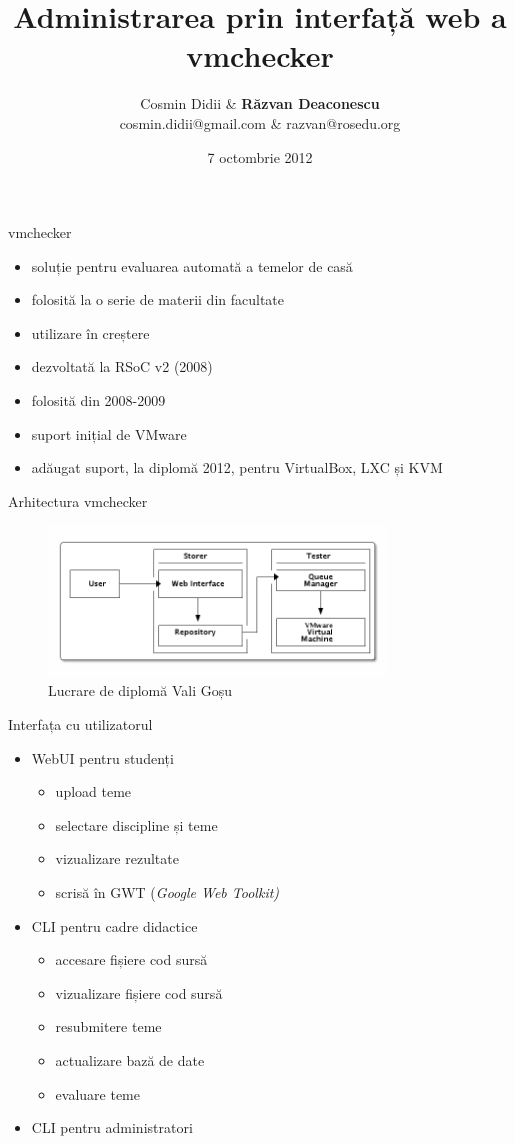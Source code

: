 \documentclass{simple}
\title[vmchecker]{Administrarea prin interfață web a vmchecker}
\institute{ROSEdu Summer of Code}
\author[Răzvan Deaconescu]{Cosmin Didii \& \textbf{Răzvan Deaconescu} \\
cosmin.didii@gmail.com \& razvan@rosedu.org}
\date{7 octombrie 2012}
\begin{document}
\frame{\titlepage}

\begin{frame}{vmchecker}
  \begin{itemize}
    \item soluție pentru evaluarea automată a temelor de casă
    \item folosită la o serie de materii din facultate
    \item utilizare în creștere
    \item dezvoltată la RSoC v2 (2008)
    \item folosită din 2008-2009
    \item suport inițial de VMware
    \item adăugat suport, la diplomă 2012, pentru VirtualBox, LXC și KVM
  \end{itemize}
\end{frame}

\begin{frame}{Arhitectura vmchecker}
  \begin{figure}
    \centering
    \includegraphics[width=0.8\textwidth]{img/vmchecker-architecture} \\
    \tiny{Lucrare de diplomă Vali Goșu}
  \end{figure}
\end{frame}

\begin{frame}{Interfața cu utilizatorul}
  \begin{itemize}
    \item WebUI pentru studenți
      \begin{itemize}
        \item upload teme
        \item selectare discipline și teme
        \item vizualizare rezultate
        \item scrisă în GWT (\textit{Google Web Toolkit)}
      \end{itemize}
    \item CLI pentru cadre didactice
      \begin{itemize}
        \item accesare fișiere cod sursă
        \item vizualizare fișiere cod sursă
        \item resubmitere teme
        \item actualizare bază de date
        \item evaluare teme
      \end{itemize}
    \item CLI pentru administratori
  \end{itemize}
\end{frame}
\end{document}
